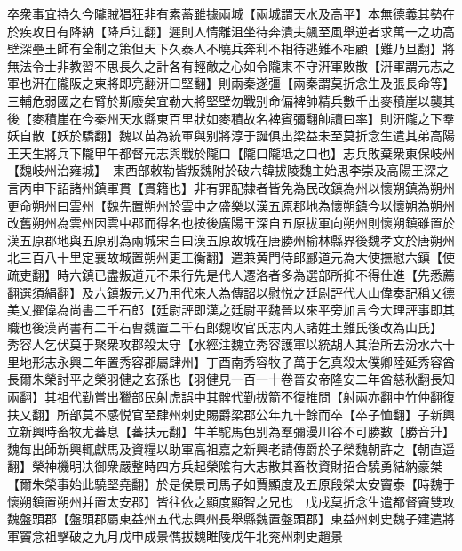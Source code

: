卒衆事宜持久今隴賊猖狂非有素蓄雖據兩城【兩城謂天水及高平】本無德義其勢在於疾攻日有降納【降戶江翻】遲則人情離沮坐待奔潰夫飊至風舉逆者求萬一之功高壁深壘王師有全制之策但天下久泰人不曉兵奔利不相待逃難不相顧【難乃旦翻】將無法令士非教習不思長久之計各有輕敵之心如令隴東不守汧軍敗散【汧軍謂元志之軍也汧在隴阪之東將即亮翻汧口堅翻】則兩秦遂彊【兩秦謂莫折念生及張長命等】三輔危弱國之右臂於斯廢矣宜勒大將堅壁勿戰别命偏裨帥精兵數千出麥積崖以襲其後【麥積崖在今秦州天水縣東百里狀如麥積故名裨賓彌翻帥讀曰率】則汧隴之下羣妖自散【妖於驕翻】魏以苗為統軍與别將淳于誕俱出梁益未至莫折念生遣其弟高陽王天生將兵下隴甲午都督元志與戰於隴口【隴口隴坻之口也】志兵敗棄衆東保岐州【魏岐州治雍城】　東西部敕勒皆叛魏附於破六韓拔陵魏主始思李崇及高陽王深之言丙申下詔諸州鎮軍貫【貫籍也】非有罪配隸者皆免為民改鎮為州以懷朔鎮為朔州更命朔州曰雲州【魏先置朔州於雲中之盛樂以漢五原郡地為懷朔鎮今以懷朔為朔州改舊朔州為雲州因雲中郡而得名也按後廣陽王深自五原拔軍向朔州則懷朔鎮雖置於漢五原郡地與五原别為兩城宋白曰漢五原故城在唐勝州榆林縣界後魏孝文於唐朔州北三百八十里定襄故城置朔州更工衡翻】遣兼黄門侍郎酈道元為大使撫慰六鎮【使疏吏翻】時六鎮已盡叛道元不果行先是代人遷洛者多為選部所抑不得仕進【先悉薦翻選須絹翻】及六鎮叛元乂乃用代來人為傳詔以慰悦之廷尉評代人山偉奏記稱乂德美乂擢偉為尚書二千石郎【廷尉評即漢之廷尉平魏晉以來平旁加言今大理評事即其職也後漢尚書有二千石曹魏置二千石郎魏收官氏志内入諸姓土難氏後改為山氏】　秀容人乞伏莫于聚衆攻郡殺太守【水經注魏立秀容護軍以統胡人其治所去汾水六十里地形志永興二年置秀容郡屬肆州】丁酉南秀容牧子萬于乞真殺太僕卿陸延秀容酋長爾朱榮討平之榮羽健之玄孫也【羽健見一百一十卷晉安帝隆安二年酋慈秋翻長知兩翻】其祖代勤嘗出獵部民射虎誤中其髀代勤拔箭不復推問【射兩亦翻中竹仲翻復扶又翻】所部莫不感悦官至肆州刺史賜爵梁郡公年九十餘而卒【卒子恤翻】子新興立新興時畜牧尤蕃息【蕃扶元翻】牛羊駝馬色别為羣彌漫川谷不可勝數【勝音升】魏每出師新興輒獻馬及資糧以助軍高祖嘉之新興老請傳爵於子榮魏朝許之【朝直遥翻】榮神機明决御衆嚴整時四方兵起榮隂有大志散其畜牧資財招合驍勇結納豪桀【爾朱榮事始此驍堅堯翻】於是侯景司馬子如賈顯度及五原段榮太安竇泰【時魏于懷朔鎮置朔州并置太安郡】皆往依之顯度顯智之兄也　戊戌莫折念生遣都督竇雙攻魏盤頭郡【盤頭郡屬東益州五代志興州長舉縣魏置盤頭郡】東益州刺史魏子建遣將軍竇念祖擊破之九月戊申成景儁拔魏睢陵戊午北兖州刺史趙景

